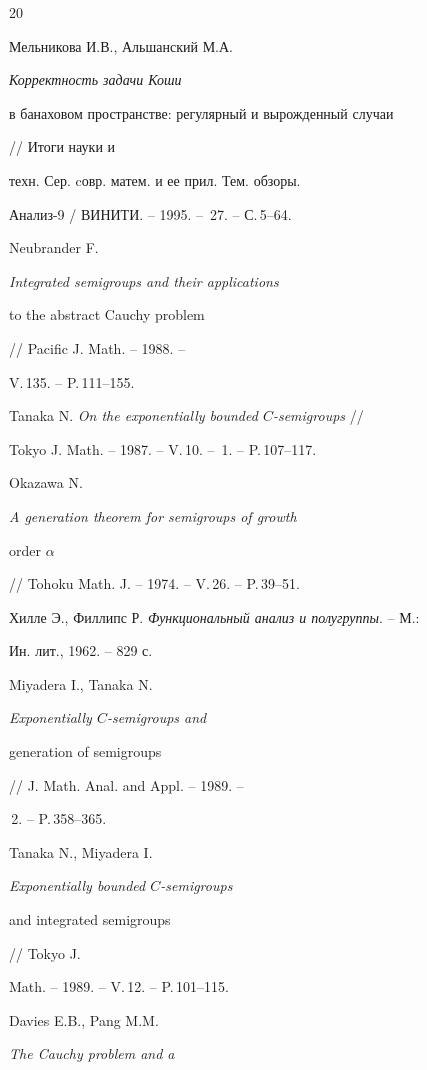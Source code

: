 \begin{thebibliography}{20}







Мельникова И.В., Альшанский М.А. {\em Корректность задачи Коши


в банаховом пространстве: регулярный и вырожденный случаи} // Итоги науки и


техн. Сер. cовр. матем. и ее прил. Тем. обзоры. 


Анализ-9 / ВИНИТИ. -- 1995. -- \No\,27. --  С.\,5--64.




Neubrander F. {\em Integrated semigroups and their applications


to the abstract Cauchy problem} // Pacific J. Math. -- 1988. --


V.\,135. -- P.\,111--155.




Tanaka N. {\em On the exponentially bounded $C$-semigroups} //


Tokyo J. Math. -- 1987. -- V.\,10. -- \No\,1. -- P.\,107--117.




Okazawa N. {\em A generation theorem for semigroups of growth


order $\alpha$} // Tohoku Math. J. -- 1974. -- V.\,26. -- P.\,39--51.




Хилле Э., Филлипс Р. {\em Функциональный анализ и полугруппы}. -- М.:


Ин. лит., 1962. -- 829 с.




Miyadera I., Tanaka N. {\em Exponentially $C$-semigroups and


generation of semigroups} // J. Math. Anal. and Appl. -- 1989. --


\No\,2. -- P.\,358--365.




Tanaka N., Miyadera I. {\em Exponentially bounded $C$-semigroups


and integrated semigroups} // Tokyo J. 


Math. -- 1989. -- V.\,12. -- P.\,101--115.




Davies E.B., Pang M.M. {\em The Cauchy problem and a


}
\end{thebibliography}
